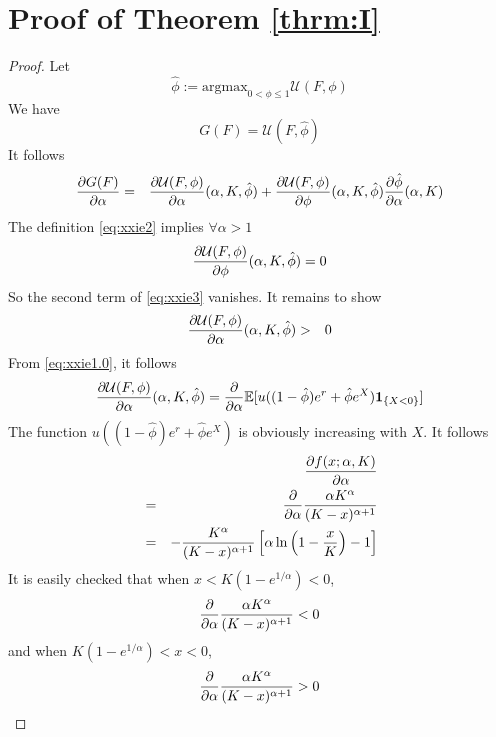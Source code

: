 \documentclass[11pt,a4]{amsart}
\newcommand{\pd}{\partial}
\newcommand{\E }{{\mathbb E}}
\newcommand{\1}{{\mathbf 1}}
\begin{document}
\section{Proof of Theorem \ref{thrm:I}}
\label{sec:thrmI_proof}
\begin{proof}
  Let
  \begin{equation}
    \label{eq:xxie2}
    \hat \phi := \text{argmax}_{0 < \phi \leq 1} \mathcal U(F, \phi)
  \end{equation}
  We have
  \[
  G(F) = \mathcal U(F, \hat\phi)
  \]
  It follows
  \begin{eqnarray}
    {\pd G(F) \over \pd \alpha}
    &=&
    {\pd \mathcal U(F, \phi) \over \pd \alpha}(\alpha, K, \hat\phi)
    + {\pd \mathcal U(F, \phi) \over \pd \phi}(\alpha, K, \hat\phi)
    {\pd \hat\phi \over \pd \alpha}(\alpha, K)
    \label{eq:xxie3}
  \end{eqnarray}
  The definition \eqref{eq:xxie2} implies $\forall \alpha > 1$
  \begin{equation}
    \label{eq:xxie4}
    {\pd \mathcal U(F, \phi) \over \pd \phi}(\alpha, K, \hat \phi) = 0
  \end{equation}
  So the second term of \eqref{eq:xxie3} vanishes. It remains to show
  \begin{eqnarray*}
    {\pd \mathcal U(F, \phi) \over \pd \alpha}(\alpha, K, \hat \phi)
    &>& 0
  \end{eqnarray*}
  From \eqref{eq:xxie1.0}, it follows
  \begin{eqnarray*}
    {\pd \mathcal U(F, \phi) \over \pd \alpha}(\alpha, K, \hat\phi)
    = {\partial \over \partial \alpha}\E[u((1 - \hat\phi) e^r + \hat\phi e^X) \1_{\{X < 0\}}]
  \end{eqnarray*}
  The function $u((1 - \hat\phi) e^r + \hat\phi e^X)$ is obviously
  increasing with $X$. It follows
  \begin{eqnarray*}
    && {\pd f(x; \alpha, K) \over \pd \alpha} \\
    &=& {\partial \over \partial \alpha} {\alpha K^\alpha \over (K - x)^{\alpha + 1}} \\
    &=&
    - {K^\alpha \over (K - x)^{\alpha + 1}}
    \left[
      \alpha
      \ln\left(
        1 - {x \over K}
      \right) - 1
    \right]
  \end{eqnarray*}
  It is easily checked that when $x < K(1 - e^{1/\alpha}) < 0$,
  \[
  {\partial \over \partial \alpha} {\alpha K^\alpha \over (K - x)^{\alpha + 1}} < 0
  \]
  and when $K(1 - e^{1/\alpha}) < x < 0$,
  \[
  {\partial \over \partial \alpha} {\alpha K^\alpha \over (K - x)^{\alpha + 1}} > 0
\]
\end{proof}
\end{document}
